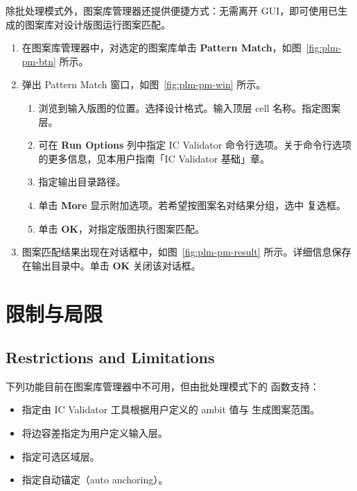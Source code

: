 除批处理模式外，图案库管理器还提供便捷方式：无需离开 GUI，即可使用已生成的图案库对设计版图运行图案匹配。

\begin{enumerate}
  \item 在图案库管理器中，对选定的图案库单击 \textbf{Pattern Match}，如图~\ref{fig:plm-pm-btn} 所示。


  \item 弹出 Pattern Match 窗口，如图~\ref{fig:plm-pm-win} 所示。


  \begin{enumerate}[label=\alph*.]
    \item 浏览到输入版图的位置。选择设计格式。输入顶层 cell 名称。指定图案层。
    \item 可在 \textbf{Run Options} 列中指定 IC Validator 命令行选项。关于命令行选项的更多信息，见本用户指南「IC Validator 基础」章。
    \item 指定输出目录路径。
    \item 单击 \textbf{More} 显示附加选项。若希望按图案名对结果分组，选中  复选框。
    \item 单击 \textbf{OK}，对指定版图执行图案匹配。
  \end{enumerate}

  \item 图案匹配结果出现在对话框中，如图~\ref{fig:plm-pm-result} 所示。详细信息保存在输出目录中。单击 \textbf{OK} 关闭该对话框。

\end{enumerate}

\section{限制与局限}
\subsection*{Restrictions and Limitations}

下列功能目前在图案库管理器中不可用，但由批处理模式下的  函数支持：
\begin{itemize}
  \item 指定由 IC Validator 工具根据用户定义的 ambit 值与  生成图案范围。
  \item 将边容差指定为用户定义输入层。
  \item 指定可选区域层。
  \item 指定自动锚定（auto anchoring）。
\end{itemize}

